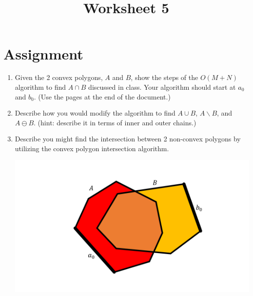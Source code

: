 \documentclass[a4paper,12pt]{article}
\title{Worksheet 5}
\begin{document}
\maketitle

\worksheetGroundRules

\worksheetSubmission

\vspace{5pt}
\section{Assignment}

\begin{enumerate}

\item Given the 2 convex polygons, $A$ and $B$, show the steps of the $O(M+N)$ algorithm to find $A \cap B$ discussed in class. Your algorithm should start at $a_0$ and $b_0$. (Use the pages at the end of the document.)
\item Describe how you would modify the algorithm to find $A \cup B$, $A \backslash B$, and $A \ominus B$. (hint: describe it in terms of inner and outer chains.)
\item Describe you might find the intersection between 2 non-convex polygons by utilizing the convex polygon intersection algorithm.


\begin{center}
\includegraphics[width=0.75\linewidth]{../images/worksheet2b.pdf}
\end{center}


\end{enumerate}

\newpage
\end{document}
